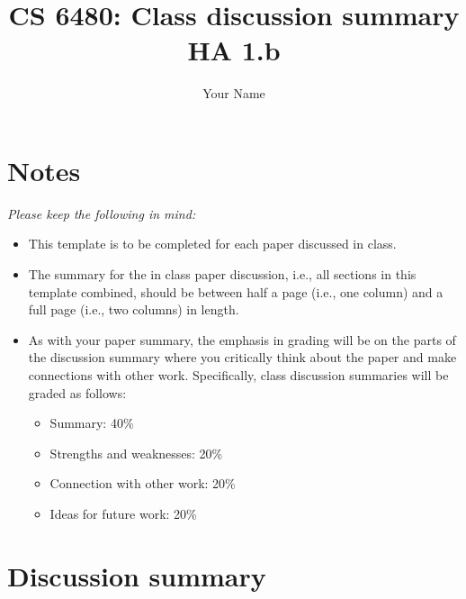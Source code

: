 \documentclass[letterpaper,twocolumn,10pt]{article}
\title{CS 6480: Class discussion summary\\
HA 1.b\\}
\author{Your Name}
\affil{School of Computing, University of Utah}
\begin{document}
\maketitle
\section*{Notes}

{\it 
Please keep the following in mind:

\begin{itemize}

\item This template is to be completed for each paper discussed in class.

\item The summary for the in class paper discussion, i.e., all sections in this
template combined, should be between half a page (i.e., one column) and a full
page (i.e., two columns) in length.

\item As with your paper summary, the emphasis in grading will
be on the parts of the discussion summary where you critically think about
the paper and make connections with other work. Specifically,
class discussion summaries will be graded as follows:
\begin{itemize}

\item Summary: 40\%

\item Strengths and weaknesses: 20\%

\item Connection with other work: 20\%

\item Ideas for future work: 20\%

\end{itemize}

\end{itemize}

}
\section*{Discussion summary}
\end{document}

